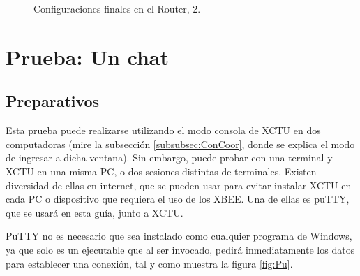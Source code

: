 \begin{figure}[H] %
\caption{Configuraciones finales en el Router, 2.}
\label{fig:RAd}
\end{figure}

\newpage

\section{Prueba: Un chat}
\subsection{Preparativos}
Esta prueba puede realizarse utilizando el modo consola de XCTU en dos computadoras (mire la subsección \ref{subsubsec:ConCoor}, donde se explica el modo de ingresar a dicha ventana). Sin embargo, puede probar con una terminal y XCTU en una misma PC, o dos sesiones distintas de terminales. Existen diversidad de ellas en internet, que se pueden usar para evitar instalar XCTU en cada PC o dispositivo que requiera el uso de los XBEE. Una de ellas es puTTY\footnotemark, que se usará en esta guía, junto a XCTU.


PuTTY no es necesario que sea instalado como cualquier programa de Windows, ya que solo es un ejecutable que al ser invocado, pedirá inmediatamente los datos para establecer una conexión, tal y como muestra la figura \ref{fig:Pu}.

